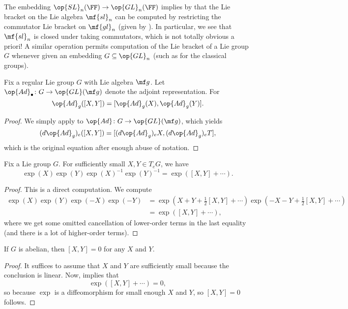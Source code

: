 \documentclass[../notes.tex]{subfiles}
\begin{document}
\begin{example}
	The embedding $\op{SL}_n(\FF)\to\op{GL}_n(\FF)$ implies by  that the Lie bracket on the Lie algebra $\mf{sl}_n$ can be computed by restricting the commutator Lie bracket on $\mf{gl}_n$ (given by ). In particular, we see that $\mf{sl}_n$ is closed under taking commutators, which is not totally obvious a priori! A similar operation permits computation of the Lie bracket of a Lie group $G$ whenever given an embedding $G\subseteq\op{GL}_n$ (such as for the classical groups).
\end{example}
\begin{corollary}
	Fix a regular Lie group $G$ with Lie algebra $\mf g$. Let $\op{Ad}_\bullet\colon G\to\op{GL}(\mf g)$ denote the adjoint representation. For
	\[\op{Ad}_g([X,Y])=[\op{Ad}_g(X),\op{Ad}_g(Y)].\]
\end{corollary}
\begin{proof}
	We simply apply  to $\op{Ad}\colon G\to\op{GL}(\mf g)$, which yields
	\[(d{\op{Ad}_g})_e([X,Y])=[(d{\op{Ad}_g})_eX,(d{\op{Ad}_g})_eT],\]
	which is the original equation after enough abuse of notation.
\end{proof}
\begin{proposition} \label{prop:exp-commutator}
	Fix a Lie group $G$. For sufficiently small $X,Y\in T_eG$, we have
	\[\exp(X)\exp(Y)\exp(X)^{-1}\exp(Y)^{-1}=\exp([X,Y]+\cdots).\]
\end{proposition}
\begin{proof}
	This is a direct computation. We compute
	\begin{align*}
		\exp(X)\exp(Y)\exp(-X)\exp(-Y) &= \exp\left(X+Y+\frac12[X,Y]+\cdots\right)\exp\left(-X-Y+\frac12[X,Y]+\cdots\right)\\
		&= \exp\left([X,Y]+\cdots\right),
	\end{align*}
	where we get some omitted cancellation of lower-order terms in the last equality (and there is a lot of higher-order terms).
\end{proof}
\begin{corollary}
	If $G$ is abelian, then $[X,Y]=0$ for any $X$ and $Y$.
\end{corollary}
\begin{proof}
	It suffices to assume that $X$ and $Y$ are sufficiently small because the conclusion is linear. Now,  implies that
	\[\exp([X,Y]+\cdots)=0,\]
	so because $\exp$ is a diffeomorphism for small enough $X$ and $Y$, so $[X,Y]=0$ follows.
\end{proof}
\end{document}

